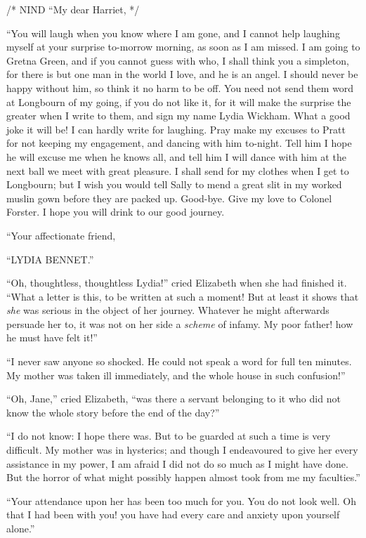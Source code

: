/* NIND ``My dear Harriet, */

``You will laugh when you know where I am gone, and I cannot help laughing myself at your surprise to-morrow morning, as soon as I am missed. I am going to Gretna Green, and if you cannot guess with who, I shall think you a simpleton, for there is but one man in the world I love, and he is an angel. I should never be happy without him, so think it no harm to be off. You need not send them word at Longbourn of my going, if you do not like it, for it will make the surprise the greater when I write to them, and sign my name Lydia Wickham. What a good joke it will be! I can hardly write for laughing. Pray make my excuses to Pratt for not keeping my engagement, and dancing with him to-night. Tell him I hope he will excuse me when he knows all, and tell him I will dance with him at the next ball we meet with great pleasure. I shall send for my clothes when I get to Longbourn; but I wish you would tell Sally to mend a great slit in my worked muslin gown before they are packed up. Good-bye. Give my love to Colonel Forster. I hope you will drink to our good journey.

``Your affectionate friend,

``LYDIA BENNET.''

``Oh, thoughtless, thoughtless Lydia!'' cried Elizabeth when she had finished it. ``What a letter is this, to be written at such a moment! But at least it shows that \textit{she} was serious in the object of her journey. Whatever he might afterwards persuade her to, it was not on her side a \textit{scheme} of infamy. My poor father! how he must have felt it!''

``I never saw anyone so shocked. He could not speak a word for full ten minutes. My mother was taken ill immediately, and the whole house in such confusion!''

``Oh, Jane,'' cried Elizabeth, ``was there a servant belonging to it who did not know the whole story before the end of the day?''

``I do not know: I hope there was. But to be guarded at such a time is very difficult. My mother was in hysterics; and though I endeavoured to give her every assistance in my power, I am afraid I did not do so much as I might have done. But the horror of what might possibly happen almost took from me my faculties.''

``Your attendance upon her has been too much for you. You do not look well. Oh that I had been with you! you have had every care and anxiety upon yourself alone.''

